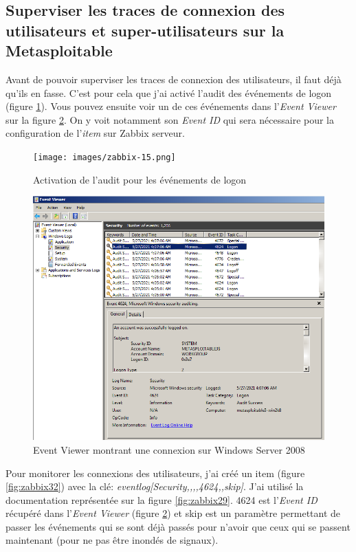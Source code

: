 \documentclass[a4paper]{article}
\begin{document}
\newpage \subsection{Superviser les traces de connexion des utilisateurs et super-utilisateurs sur la Metasploitable}





Avant de pouvoir superviser les traces de connexion des utilisateurs, il faut déjà qu'ils en fasse. C'est pour cela que j'ai activé l'audit des événements de logon (figure \ref{fig:zabbix15}). Vous pouvez ensuite voir un de ces événements dans l'\textit{Event Viewer} sur la figure \ref{fig:zabbix28}. On y voit notamment son \textit{Event ID} qui sera nécessaire pour la configuration de l'\textit{item} sur Zabbix serveur.

\begin{figure}[H]
    \centering
    \texttt{[image: images/zabbix-15.png]}
    \caption{Activation de l'audit pour les événements de logon}
    \label{fig:zabbix15}
\end{figure}
\begin{figure}[H]
    \centering
    \includegraphics[width=0.95\linewidth]{images/zabbix-28.png}
    \caption{Event Viewer montrant une connexion sur Windows Server 2008}
    \label{fig:zabbix28}
\end{figure}

Pour monitorer les connexions des utilisateurs, j'ai créé un item (figure \ref{fig:zabbix32}) avec la clé: \textit{eventlog[Security,,,,4624,,skip]}. J'ai utilisé la documentation représentée sur la figure \ref{fig:zabbix29}. 4624 est l'\textit{Event ID} récupéré dans l'\textit{Event Viewer} (figure \ref{fig:zabbix28}) et skip est un paramètre permettant de passer les événements qui se sont déjà passés pour n'avoir que ceux qui se passent maintenant (pour ne pas être inondés de signaux).
\end{document}
